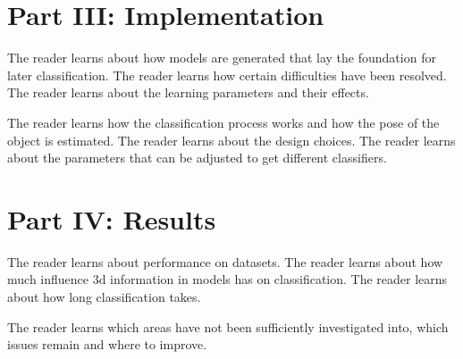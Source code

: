 \section*{Part III: Implementation}

  \vspace{1mm}

The reader learns about how models are generated that lay the foundation for
later classification. The reader learns how certain difficulties have been
resolved. The reader learns about the learning parameters and their effects.

  \vspace{1mm}

The reader learns how the classification process works and how the pose of the
object is estimated. The reader learns about the design choices.  The reader
learns about the parameters that can be adjusted to get different classifiers.

  \vspace{1mm}

\section*{Part IV: Results}

  \vspace{1mm}

The reader learns about performance on datasets. The reader learns about how much
influence 3d information in models has on classification. The reader learns about
how long classification takes. 

  \vspace{1mm}

The reader learns which areas have not been sufficiently investigated into,
which issues remain and where to improve.

  \vspace{1mm}

